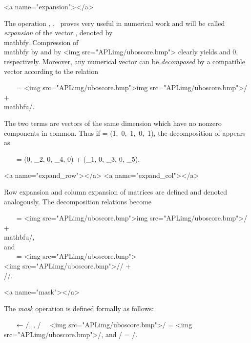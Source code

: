 <a name="expansion"></a>
\par The operation \0, , \ proves very useful in numerical work and will be called
\textit{expansion} of the vector , denoted by \\mathbf{y}. Compression of \\mathbf{y} by  and by <img src="APLimg/uboscore.bmp"> clearly yields  and 0, respectively. Moreover, any numerical vector  can be \textit{decomposed} by a compatible vector
 according to the relation

\par \ \ \  =
<img src="APLimg/uboscore.bmp">\<img src="APLimg/uboscore.bmp">/ +
\\mathbf{u}/.

\par The two terms are vectors of the same dimension which have no nonzero components in common. Thus if  = (1,\ 0,\ 1,\ 0,\ 1), the decomposition of  appears as

\par \ \ \  = (0, _{2}, 0, _{4}, 0) + (_{1}, 0, _{3}, 0, _{5}).

<a name="expand_row"></a>
<a name="expand_col"></a>
\par Row expansion and column expansion of matrices are defined and denoted analogously. The decomposition relations become

\par \ \ \ 
 = 
<img src="APLimg/uboscore.bmp">\<img src="APLimg/uboscore.bmp">/ +
\mathbf{u}\/,\\ and\\\ \ \ 
\mathbf{X} = 
<img src="APLimg/uboscore.bmp">\\<img src="APLimg/uboscore.bmp">//\mathbf{X} +
\\\mathbf{u}//.

<a name="mask"></a>
\par The \textit{mask} operation is defined formally as follows:

\par \ \ \  ← /\mathbf{a}, , / \ \leftrightarrow\ 
<img src="APLimg/uboscore.bmp">/ = 
<img src="APLimg/uboscore.bmp">/, and
\mathbf{u}/\mathbf{c} = \mathbf{u}/\mathbf{b}.

